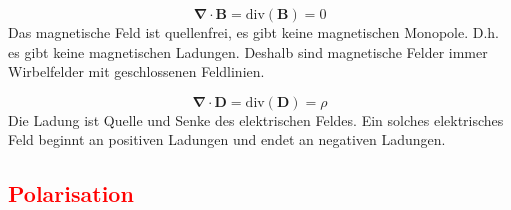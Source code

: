 				\begin{tcolorbox}[title=Dritte Maxwell'sche Gleichung - Quellenfreiheit (Divergenzfreiheit) von magnetischen Feldern]
					\begin{equation}
						\bm{\nabla \cdot B} = \text{div}(\bm{B}) = 0
					\end{equation}
					\tcblower
					Das magnetische Feld ist quellenfrei, es gibt keine magnetischen Monopole. D.h. es gibt keine magnetischen Ladungen. Deshalb sind magnetische Felder immer Wirbelfelder mit geschlossenen Feldlinien.
				\end{tcolorbox}	
					
				\begin{tcolorbox}[title=Vierte Maxwell'sche Gleichung - Quellenbehaftetes elektrisches Feld (Divergenz)]
					\begin{equation}
					\bm{\nabla \cdot D} = \text{div}(\bm{D}) = \rho
					\end{equation}
					\tcblower
					Die Ladung ist Quelle und Senke des elektrischen Feldes. Ein solches elektrisches Feld beginnt an positiven Ladungen und endet an negativen Ladungen.
				\end{tcolorbox}	
		
		\newpage
		\subsection{\textcolor{red}{Polarisation}}
